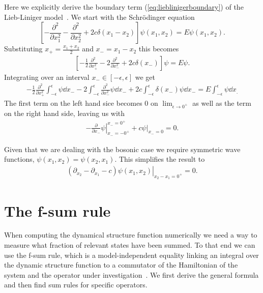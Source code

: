\documentclass[11pt, a4paper]{report} %
\begin{document}
Here we explicitly derive the boundary term (\cref{eq:lieblinigerboundary}) of the Lieb-Liniger model~\cite{Caux2015}.
We start with the Schrödinger equation
\begin{equation}
	\left[- \frac{\partial^2}{\partial x_1^2} - \frac{\partial^2}{\partial x_2^2} + 2c \delta(x_1 - x_2)\right] \psi(x_1, x_2) = E \psi(x_1,x_2).
\end{equation} 
Substituting \(x_+ = \frac{x_1+x_2}{2}\) and \(x_-=x_1-x_2\) this becomes
\begin{align}
  \label{eq:17}
  	\left[-\frac{1}{2}\frac{\partial^2}{\partial x_+^2} - 2\frac{\partial^2}{\partial x_-^2} + 2c \delta(x_-)\right] \psi = E\psi.
\end{align}
Integrating over an interval \(x_-\in[-\epsilon,\epsilon]\) we get
\begin{align}
  \label{eq:18}
  -\frac{1}{2} \frac{\partial^2}{\partial x_+^2} \int_{-\epsilon}^{\epsilon} \psi \dd x_- - 2 \int_{-\epsilon}^{\epsilon} \frac{\partial^2}{\partial x_-^2}\psi \dd x_- + 2c\int_{-\epsilon}^{\epsilon} \delta(x_-)\psi \dd x_- = E\int_{-\epsilon}^{\epsilon} \psi \dd x_.
\end{align}
The first term on the left hand sice becomes 0 on \(\lim_{\epsilon\to0^+}\) as well as the term on the right hand side, leaving us with
\begin{align}
  \label{eq:19}
  \left.- \frac{\partial}{\partial x_-} \psi \right|_{x_-=-0^+}^{x_-=0^+}  + \left.c\psi\right|_{x_-=0} = 0.
\end{align}

Given that we are dealing with the bosonic case we require symmetric wave functions, \(\psi(x_1,x_2)=\psi(x_2,x_1)\).
This simplifies the result to
\begin{align}
  \label{eq:20}
  \left.(\partial_{x_2} - \partial_{x_1} - c) \psi(x_1, x_2)\right|_{x_2-x_1=0^+} = 0.
\end{align}

\chapter{The f-sum rule}\label{cha:f-sum-rule}

When computing the dynamical structure function numerically we need a way to measure what fraction of relevant states have been summed.
To that end we can use the f-sum rule, which is a model-independent equality linking an integral over the dynamic structure function to a commutator of the Hamiltonian of the system and the operator under investigation~\cite{pitaevskii}.
We first derive the general formula and then find sum rules for specific operators.
\end{document}
